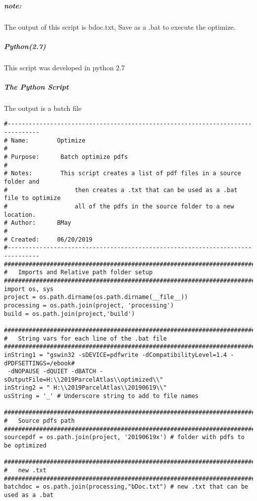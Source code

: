 \subparagraph*{\textit{note:}} The output of this script is bdoc.txt, Save as a .bat to execute the optimize.

\subparagraph{Python(2.7)} This script was developed in python 2.7

\subparagraph{The Python Script}  The output is a batch file
{\begin{footnotesize}\color{orange}
\begin{verbatim}
#-------------------------------------------------------------------------------
# Name:        Optimize
#
# Purpose:      Batch optimize pdfs
#
# Notes:        This script creates a list of pdf files in a source folder and
#                   then creates a .txt that can be used as a .bat file to optimize
#                   all of the pdfs in the source folder to a new location.
# Author:      BMay
#
# Created:     06/20/2019
#-------------------------------------------------------------------------------
################################################################################
#   Imports and Relative path folder setup
################################################################################
import os, sys
project = os.path.dirname(os.path.dirname(__file__))
processing = os.path.join(project, 'processing')
build = os.path.join(project,'build')

################################################################################
#   String vars for each line of the .bat file
################################################################################
inString1 = "gswin32 -sDEVICE=pdfwrite -dCompatibilityLevel=1.4 -dPDFSETTINGS=/ebook#
 -dNOPAUSE -dQUIET -dBATCH -sOutputFile=H:\\2019ParcelAtlas\\optimized\\"
inString2 = " H:\\2019ParcelAtlas\\20190619\\"
usString = '_' # Underscore string to add to file names

################################################################################
#   Source pdfs path
################################################################################
sourcepdf = os.path.join(project, '20190619x') # folder with pdfs to be optimized

################################################################################
#   new .txt
################################################################################
batchdoc = os.path.join(processing,"bDoc.txt") # new .txt that can be used as a .bat


\end{verbatim}
\end{footnotesize}}
